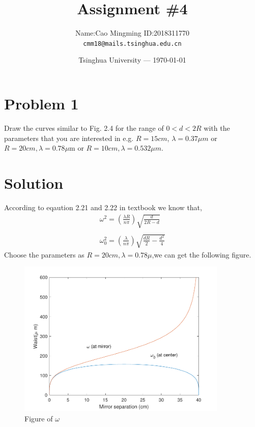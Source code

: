 \documentclass{article}
\title{Assignment \#4} %
\author{Name:Cao Mingming \indent \indent ID:2018311770\\ \texttt{cmm18@mails.tsinghua.edu.cn}} %
\date{Tsinghua University --- \today} %
\begin{document}
\maketitle %


\section{Problem 1} %
Draw the curves similar to Fig. 2.4 for the range of $0<d<2R$ with the parameters that you are
interested in e.g. $R = 15 cm$, $\lambda= 0.37 \mu m$ or $R = 20 cm, \lambda = 0.78\mu $m or $ R=10cm, \lambda=0.532 \mu m$.
\section*{Solution}
According to eqaution 2.21 and 2.22 in textbook we know that,
\begin{equation}
	\begin{array}{l}
		\omega^2=\left(\frac{\lambda R}{n\pi}\right)\sqrt{\frac{d}{2R-d}}\\
		\\
		\omega_{0}^2=\left(\frac{\lambda}{n\pi}\right)\sqrt{\frac{dR}{2}-\frac{d^2}{4}}
	\end{array}
\end{equation}
Choose the parameters as $R = 20 cm, \lambda = 0.78\mu $,we can get the following figure.
\begin{figure}[h]
	\centering
	\includegraphics[width=10cm]{f1.pdf}
	\caption{Figure of $\omega $}
\end{figure}
\end{document}
